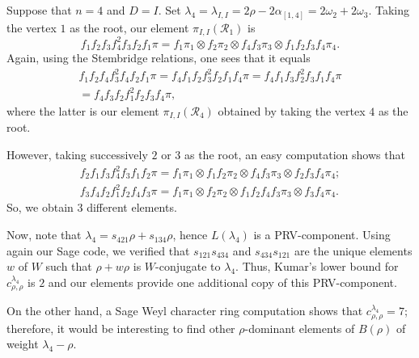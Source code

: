 \documentclass[12pt]{amsart}
\numberwithin{equation}{section}
\theoremstyle{definition}
\def\calR{\mathcal{R}} %
\begin{document}
\subsection{} Suppose that $n=4$ and $D=I$. Set $\lambda_4 = \lambda_{I,I} = 2\rho - 2\alpha_{[1,4]} = 2\omega_2 + 2\omega_3$. 
Taking the vertex $1$ as the root, our element $\pi_{I,I}(\calR_1)$ is 
\begin{equation} 
f_1 f_2 f_3 f_4^2 f_3 f_2 f_1 \pi = f_1 \pi_1 \otimes f_2 \pi_2 \otimes f_4 f_3 \pi_3 \otimes f_1 f_2 f_3 f_4 \pi_4 . 
\end{equation} 
Again, using the Stembridge relations, one sees that it equals 
\begin{multline*} 
f_1 f_2 f_4 f_3^2 f_4 f_2 f_1 \pi = f_4 f_1 f_2 f_3^2 f_2 f_1 f_4 \pi = 
f_4 f_1 f_3 f_2^2 f_3 f_1 f_4 \pi 
\\ 
= f_4 f_3 f_2 f_1^2 f_2 f_3 f_4 \pi, 
\end{multline*} 
where the latter is our element $\pi_{I,I}(\calR_4)$ obtained by taking the vertex $4$ as the root. 

\smallskip However, taking successively $2$ or $3$ as the root, an easy computation shows that 
\begin{gather} 
f_2 f_1 f_3 f_4^2 f_3 f_1 f_2 \pi  = f_1 \pi_1 \otimes f_1 f_2 \pi_2 \otimes f_4 f_3 \pi_3  \otimes f_2 f_3 f_4 \pi_4 ; 
\\
f_3 f_4 f_2 f_1^2 f_2 f_4 f_3\pi = f_1 \pi_1 \otimes f_2 \pi_2 \otimes f_1 f_2 f_4 f_3 \pi_3  \otimes f_3 f_4 \pi_4 .
\end{gather} 
So, we obtain $3$ different elements. 

\smallskip 
Now, note that $\lambda_4 = s_{421} \rho + s_{134} \rho$, hence $L(\lambda_4)$ is a PRV-component. 
Using again our Sage code, we verified that $s_{121}s_{434}$ and $s_{434} s_{121}$ 
are the unique elements $w$ of $W$ such that $\rho + w\rho$ is $W$-conjugate to $\lambda_4$. Thus, 
Kumar's lower bound for $c^{\lambda_4}_{\rho,\rho}$ is $2$ and 
our elements provide one additional copy of this PRV-component. 

On the other hand, 
a Sage Weyl character ring computation shows that $c^{\lambda_4}_{\rho,\rho} = 7$; therefore, 
it would be interesting to find other $\rho$-dominant elements of $B(\rho)$ of weight $\lambda_4 - \rho$. 
\end{document}
